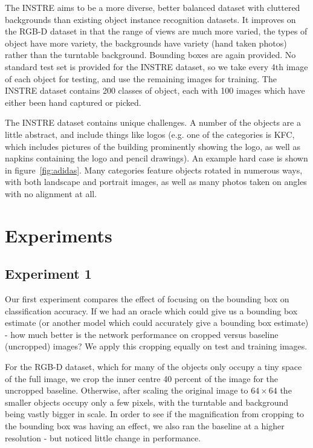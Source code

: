 The INSTRE \cite{Wang2015} aims to be a more diverse, better balanced dataset with cluttered backgrounds than existing object instance recognition datasets. It improves on the RGB-D dataset in that the range of views are much more varied, the types of object have more variety, the backgrounds have variety (hand taken photos) rather than the turntable background. Bounding boxes are again provided. No standard test set is provided for the INSTRE dataset, so we take every 4th image of each object for testing, and use the remaining images for training. The INSTRE dataset contains 200 classes of object, each with 100 images which have either been hand captured or picked. 

The INSTRE dataset contains unique challenges. A number of the objects are a little abstract, and include things like logos (e.g. one of the categories is KFC, which includes pictures of the building prominently showing the logo, as well as napkins containing the logo and pencil drawings). An example hard case is shown in figure~\ref{fig:adidas}. Many categories feature objects rotated in numerous ways, with both landscape and portrait images, as well as many photos taken on angles with no alignment at all.

\section {Experiments}


\subsection {Experiment 1}

Our first experiment compares the effect of focusing on the bounding box on classification accuracy. If we had an oracle which could give us a bounding box estimate (or another model which could accurately give a bounding box estimate) - how much better is the network performance on cropped versus baseline (uncropped) images? We apply this cropping equally on test and training images.

For the RGB-D dataset, which for many of the objects only occupy a tiny space of the full image, we crop the inner centre 40 percent of the image for the uncropped baseline. Otherwise, after scaling the original image to $ 64 \times 64 $ the smaller objects occupy only a few pixels, with the turntable and background being vastly bigger in scale. In order to see if the magnification from cropping to the bounding box was having an effect, we also ran the baseline at a higher resolution - but noticed little change in performance.


